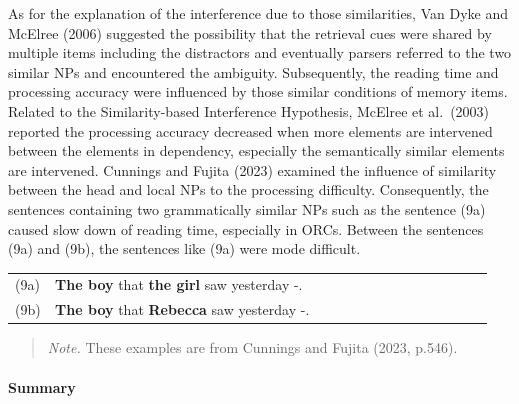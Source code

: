 \documentclass[
]{article}
\begin{document}
As for the explanation of the interference due to those similarities,
Van Dyke and McElree (2006) suggested the possibility that the retrieval
cues were shared by multiple items including the distractors and
eventually parsers referred to the two similar NPs and encountered the
ambiguity. Subsequently, the reading time and processing accuracy were
influenced by those similar conditions of memory items. Related to the
Similarity-based Interference Hypothesis, McElree et al.~(2003) reported
the processing accuracy decreased when more elements are intervened
between the elements in dependency, especially the semantically similar
elements are intervened. Cunnings and Fujita (2023) examined the
influence of similarity between the head and local NPs to the processing
difficulty. Consequently, the sentences containing two grammatically
similar NPs such as the sentence (9a) caused slow down of reading time,
especially in ORCs. Between the sentences (9a) and (9b), the sentences
like (9a) were mode difficult.

\vspace{1em}

\setlength{\parindent}{0pt}
\noindent
\begin{tabular}[t]{@{}p{0.05\linewidth} p{0.75\linewidth} >{\raggedleft\arraybackslash}p{0.15\linewidth}@{}}
(9a) & \textbf{The boy} that \textbf{the girl} saw yesterday -. & [similar] \\
(9b) & \textbf{The boy} that \textbf{Rebecca} saw yesterday -. & [dissimilar] \\
\end{tabular}

\vspace{0.5em}

\noindent
\begin{quote}
\small
\textit{Note.} These examples are from Cunnings and Fujita (2023, p.546).
\end{quote}


\vspace{1em}

\paragraph{Summary}\label{summary-1}
\end{document}
